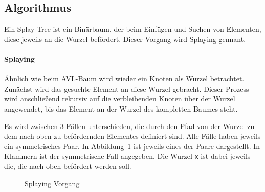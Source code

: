 \subsection{Algorithmus}\label{subsec:splay-algorithmus}
Ein Splay-Tree ist ein Binärbaum, der beim Einfügen und Suchen von Elementen, diese jeweils an
die Wurzel befördert.
Dieser Vorgang wird Splaying gennant.

\paragraph{Splaying}
Ähnlich wie beim AVL-Baum wird wieder ein Knoten als Wurzel betrachtet.
Zunächst wird das gesuchte Element an diese Wurzel gebracht.
Dieser Prozess wird anschließend rekursiv auf die verbleibenden Knoten über der Wurzel angewendet,
bis das Element an der Wurzel des kompletten Baumes steht.

Es wird zwischen 3 Fällen unterschieden, die durch den Pfad von der Wurzel zu dem nach oben
zu befördernden Elementes definiert sind.
Alle Fälle haben jeweils ein symmetrisches Paar.
In Abbildung~\ref{fig:splayinCase} ist jeweils eines der Paare dargestellt.
In Klammern ist der symmetrische Fall angegeben.
Die Wurzel \verb|x| ist dabei jeweils die, die nach oben befördert werden soll.

\begin{figure}[hbt]
    \centering
    \qquad
    \qquad
    \caption{Splaying Vorgang}\label{fig:splayinCase}
\end{figure}

